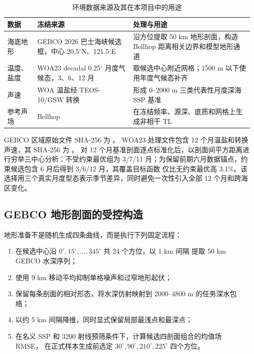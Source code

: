 \documentclass[UTF8,11pt]{ctexart}
\begin{document}
\begin{table}[H]
\centering
\caption{环境数据来源及其在本项目中的用途}
\begin{tabularx}{\textwidth}{L{3.1cm}L{4.2cm}Y}
\toprule
数据 & 冻结来源 & 处理与用途 \\
\midrule
海底地形 & GEBCO 2026 巴士海峡候选框，中心 20.5$^\circ$N、121.5$^\circ$E &
沿方位提取 50 km 地形剖面，构造 Bellhop 距离相关边界和模型地形通道 \\
温度、盐度 & WOA23 decadal 0.25$^\circ$ 月度气候态，3、6、12 月 &
取候选中心附近网格；1500 m 以下使用年度气候态补齐 \\
声速 & WOA 温盐经 TEOS-10/GSW 转换 &
形成 0--2000 m 三类代表性月度深海 SSP 基准 \\
参考声场 & Bellhop &
在冻结频率、源深、底质和网格上生成非相干 TL \\
\bottomrule
\end{tabularx}
\end{table}

GEBCO 区域原始文件 SHA-256 为
。
WOA23 处理文件包含 12 个月温盐和转换声速，其 SHA-256 为
。
对 12 个月基准剖面逐点标准化后，以剖面间平方距离进行穷举三中心分析：不受约束最优组为
3/7/11 月；为保留前期六月数据锚点，约束候选包含 6 月后得到 3/6/12 月，其覆盖目标函数
仅比无约束最优高 3.1\%。该选择用三个真实月度型态表示季节差异，同时避免一次性引入全部
12 个月和跨海区变化。

\subsection{GEBCO 地形剖面的受控构造}

地形准备不是随机生成四条曲线，而是执行下列固定流程：
\begin{enumerate}
  \item 在候选中心沿 $0^\circ,15^\circ,\ldots,345^\circ$ 共 24 个方位，以 1 km 间隔
  提取 50 km GEBCO 水深序列；
  \item 使用 9 km 移动平均抑制单格噪声和过窄地形起伏；
  \item 保留每条剖面的相对形态，将水深仿射映射到 2000--4800 m 的任务深水包络；
  \item 以约 5 km 间隔降维，同时显式保留局部最浅点和最深点；
  \item 在名义 SSP 和 3200 射线预筛条件下，计算候选四剖面组合的均值场 RMSE，
  在正式样本生成前选定 $30^\circ,90^\circ,210^\circ,225^\circ$ 四个方位。
\end{enumerate}
\end{document}
